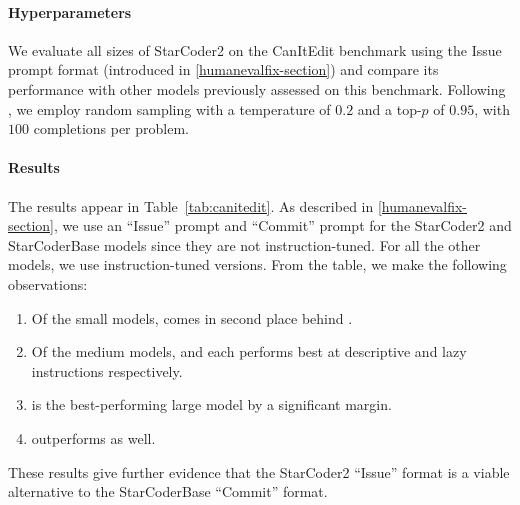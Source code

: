 \documentclass[10pt]{article} %
\begin{document}
\paragraph{Hyperparameters} 
We evaluate all sizes of StarCoder2 on the CanItEdit benchmark using the Issue prompt format (introduced in \cref{humanevalfix-section}) and compare its performance with other models previously assessed on this benchmark.
Following \citet{cassano2023edit}, we employ random sampling with a temperature of $0.2$ and a top-$p$ of $0.95$, with $100$ completions per problem.

\paragraph{Results} The results appear in  Table~\ref{tab:canitedit}. As described in \cref{humanevalfix-section}, we use an ``Issue'' prompt and ``Commit'' prompt for the StarCoder2 and StarCoderBase models since they are not instruction-tuned. For all the other models, we use instruction-tuned versions. From the table, we make the following observations:
\begin{enumerate}
    \item Of the small models,  comes in second place behind .

    \item Of the medium models,  and  each performs best at descriptive and lazy instructions respectively.

    \item {} is the best-performing large model by a significant margin.

    \item {} outperforms  as well.
    
\end{enumerate}
These results give further evidence that the StarCoder2 ``Issue'' format is a viable alternative to the StarCoderBase ``Commit'' format.
\end{document}
